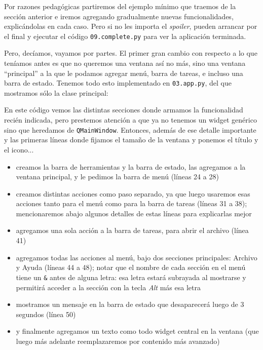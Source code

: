Por razones pedagógicas partiremos del ejemplo mínimo que traemos de la sección anterior e iremos agregando gradualmente nuevas funcionalidades, explicándolas en cada caso. Pero si no les importa el \textit{spoiler}, pueden arrancar por el final y ejecutar el código \texttt{09.complete.py} para ver la aplicación terminada.

Pero, decíamos, vayamos por partes. El primer gran cambio con respecto a lo que teníamos antes es que no queremos una ventana así no más, sino una ventana ``principal'' a la que le podamos agregar menú, barra de tareas, e incluso una barra de estado. Tenemos todo esto implementado en \texttt{03.app.py}, del que mostramos sólo la clase principal:


En este código vemos las distintas secciones donde armamos la funcionalidad recién indicada, pero prestemos atención a que ya no tenemos un widget genérico sino que heredamos de \texttt{QMainWindow}. Entonces, además de ese detalle importante y las primeras líneas donde fijamos el tamaño de la ventana y ponemos el título y el icono...

\begin{itemize}
    \item creamos la barra de herramientas y la barra de estado, las agregamos a la ventana principal, y le pedimos la barra de menú (líneas 24 a 28)
    \item creamos distintas acciones como paso separado, ya que luego usaremos esas acciones tanto para el menú como para la barra de tareas (líneas 31 a 38); mencionaremos abajo algunos detalles de estas líneas para explicarlas mejor
    \item agregamos una sola acción a la barra de tareas, para abrir el archivo (línea 41)
    \item agregamos todas las acciones al menú, bajo dos secciones principales: Archivo y Ayuda (líneas 44 a 48); notar que el nombre de cada sección en el menú tiene un \texttt{\&} antes de alguna letra: esa letra estará subrayada al mostrarse y permitirá acceder a la sección con la tecla \textit{Alt} más esa letra
    \item mostramos un mensaje en la barra de estado que desaparecerá luego de 3 segundos (línea 50)
    \item y finalmente agregamos un texto como todo widget central en la ventana (que luego más adelante reemplazaremos por contenido más avanzado)
\end{itemize}

